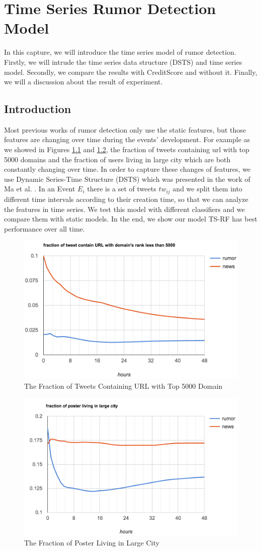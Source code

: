 
\chapter{Time Series Rumor Detection Model} %
\label{cha:timr_seriers_rumor_model}
In this capture, we will introduce the time series model of rumor detection. Firstly, we will intrude the time series data structure (DSTS) and time series model. Secondly, we compare the results with CreditScore and without it. Finally, we will a discussion about the result of experiment. 

\section{Introduction}

Most previous works of rumor detection only use the static features, but those features are changing over time during the events' development. 
For example as we showed in Figures \ref{fig:Url5000} and \ref{fig:largecity}, the fraction of tweets containing url with top 5000 domains and the fraction of users living in large city which are both constantly changing over time. In order to capture these changes of features, we use Dynamic Series-Time Structure (DSTS) which was presented in the work of Ma et al. \cite{ma2015detect}. In an Event $E_{i}$ there is a set of tweets $tw_{ij}$ and we split them into different time intervals according to their creation time, so that we can analyze the features in time series. We test this model with different classifiers and we compare them with static models.  In the end, we show our model TS-RF has best performance over all time.


\begin{figure}[!h]
\centering
\includegraphics[width=0.52\columnwidth]{images/url5000.png}
\caption{The Fraction of Tweets Containing URL with Top 5000 Domain}
\label{fig:Url5000}
\end{figure}
\begin{figure}[!h]
\centering
\includegraphics[width=0.52\columnwidth]{images/largecity.png}
\caption{The Fraction of Poster Living in Large City}
\label{fig:largecity}
\end{figure}
\newpage
